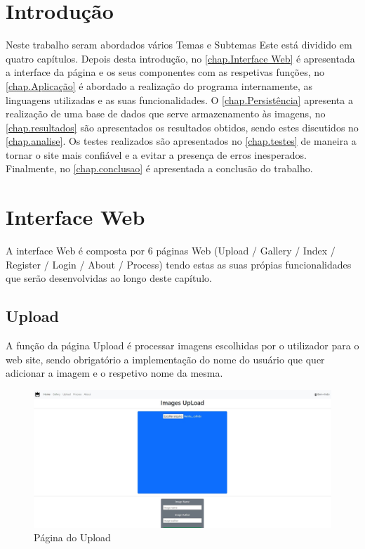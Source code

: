 \documentclass{report}
\begin{document}
\clearpage
{}

\chapter{Introdução}
\label{chap.introducao}

Neste trabalho seram abordados vários Temas e Subtemas
Este está dividido em quatro capítulos.
Depois desta introdução,
no \autoref{chap.Interface Web} é apresentada a interface da página e os seus componentes com as respetivas funções,
no \autoref{chap.Aplicação} é abordado a realização do programa internamente, as linguagens utilizadas e as suas funcionalidades. O \autoref{chap.Persistência} apresenta a realização de uma base de dados que serve armazenamento às imagens, 
no \autoref{chap.resultados} são apresentados os resultados obtidos,
sendo estes discutidos no \autoref{chap.analise}.
Os testes realizados são apresentados no \autoref{chap.testes} de maneira a tornar o site mais confiável e a evitar a presença de erros inesperados.
Finalmente, no \autoref{chap.conclusao} é apresentada a conclusão do trabalho.

\chapter{Interface Web}
\label{chap.Interface Web}
A interface Web é composta por 6 páginas Web (Upload / Gallery / Index / Register / Login / About / Process) tendo estas as suas própias funcionalidades que serão desenvolvidas ao longo deste capítulo.\\

\section{Upload}

    A função da página Upload é processar imagens escolhidas por o utilizador para o web site, sendo obrigatório a implementação do nome do usuário que quer adicionar a imagem e o respetivo nome da mesma. \\ [10pt]



\begin{figure}[h]
    \centering
    \includegraphics[width=\textwidth]{upload.jpg}
    \caption{Página do Upload}
\end{figure}
\end{document}
